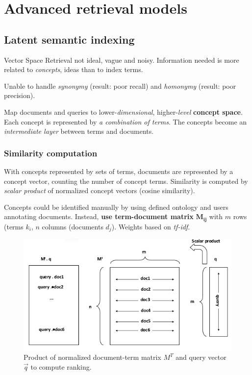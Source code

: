 \section{Advanced retrieval models}
\subsection{Latent semantic indexing}
Vector Space Retrieval not ideal, vague and noisy. Information needed is more related to \emph{concepts}, ideas than to index terms.

Unable to handle \emph{synonymy} (result: poor recall) and \emph{homonymy} (result: poor precision).

Map documents and queries to lower-\emph{dimensional}, higher-\emph{level} \textbf{concept space}. Each concept is represented by \emph{a combination of terms}. The concepts become an \emph{intermediate layer} between terms and documents.

\subsubsection{Similarity computation} With concepts represented by sets of terms, documents are represented by a concept vector, counting the number of concept terms. Similarity is computed by \emph{scalar product} of normalized concept vectors (cosine similarity).

Concepts could be identified manually by using defined ontology and users annotating documents. Instead, \textbf{use term-document matrix} $\mathbf{M_{ij}}$ with $m$ rows (terms $k_i$, $n$ columns (documents $d_j$). Weights based on \emph{tf-idf}.

\begin{figure}
  \centering
  \includegraphics[width=\linewidth]{figures/computing_ranking.png}
  \caption{Product of normalized document-term matrix $M^T$ and query vector $\vec{q}$ to compute ranking.}
  \label{fig:computing_ranking}
\end{figure}

